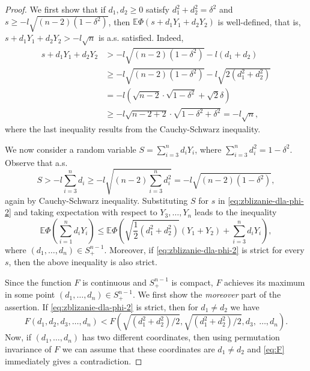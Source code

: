 \documentclass[11pt]{amsart}
\newcommand{\1}{\mathbf{1}}
\newcommand{\E}{\mathbb{E}}
\theoremstyle{definition}
\theoremstyle{definition}
\theoremstyle{remark}
\begin{document}
\begin{proof}
We first show that if $d_1, d_2 \geq 0$ satisfy $d_1^2+d_2^2=\delta^2$ and $s \geq - l \sqrt{(n-2)(1-\delta^2)}$, then $\E \Phi \left( s + d_1 Y_1 + d_2 Y_2\right)$ is well-defined, that is, $s+d_1 Y_1 + d_2 Y_2 > -l \sqrt{n}$ is a.s. satisfied.  Indeed,
\begin{align*}
	s+ d_1 Y_1 + d_2 Y_2 & > -l \sqrt{(n-2)(1 - \delta^2)} - l(d_1+d_2) 
	 \\ & \geq -l\sqrt{(n-2)(1 - \delta^2)} -l\sqrt{2(d_1^2+d_2^2)}  \\
	& = -l\left( \sqrt{n-2} \cdot \sqrt{1-\delta^2} + \sqrt{2} \delta \right)  
	  \\ & \geq - l \sqrt{n-2+2} \cdot \sqrt{1-\delta^2 + \delta^2} = - l \sqrt{n}, 
\end{align*}
where the last inequality results from the Cauchy-Schwarz inequality. 

We now consider a random variable $S=\sum_{i=3}^n d_i Y_i$, where $\sum_{i=3}^n d_i^2=1-\delta^2$. Observe that a.s.
\[
	S > - l \sum_{i=3}^n d_i \geq -l \sqrt{(n-2) \sum_{i=3}^n d_i^2} = -l \sqrt{(n-2) (1-\delta^2)},  
\] 
again by Cauchy-Schwarz inequality. Substituting $S$ for $s$ in \eqref{eq:zblizanie-dla-phi-2} and taking expectation with respect to $Y_3, \ldots, Y_n$ leads to the inequality
\[
	\E \Phi\left( \sum_{i=1}^n d_i Y_i \right) \leq \E \Phi\left( \sqrt{\frac12(d_1^2+d_2^2)}(Y_1 + Y_2) + \sum_{i=3}^n d_i Y_i \right),
\]
where $(d_1, \ldots, d_n) \in S_+^{n-1}$.
Moreover, if  \eqref{eq:zblizanie-dla-phi-2} is strict for every $s$, then the above inequality is also strict. 

Since the function $F$ is continuous and $S_+^{n-1}$ is compact, $F$ achieves its maximum in some point $(d_1, \ldots, d_n) \in S_+^{n-1}$. We first show the \emph{moreover} part of the assertion. If  \eqref{eq:zblizanie-dla-phi-2} is strict,  then for $d_1 \ne d_2$ we have 
\begin{equation}\label{eq:F}
F(d_1, d_2, d_3, \ldots, d_n) <  F\left(\sqrt{(d_1^2+d_2^2)/2}, \sqrt{(d_1^2+d_2^2)/2}, d_3,\ \ldots, d_n\right).
\end{equation}
Now, if $(d_1, \ldots, d_n)$ has two different coordinates, then using permutation invariance of $F$ we can assume that these coordinates are $d_1 \ne d_2$ and \eqref{eq:F} immediately gives a contradiction.  


\end{proof}
\end{document}

